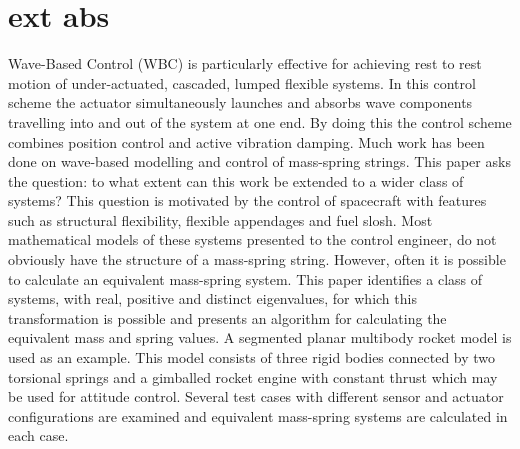 \documentclass{mbd_fullpaper}
\begin{document}
\section{ext abs}

Wave-Based Control (WBC) is particularly effective for achieving rest to rest motion of under-actuated, cascaded, lumped flexible systems.
In this control scheme the actuator simultaneously launches and absorbs wave components travelling into and out of the system at one end.
By doing this the control scheme combines position control and active vibration damping.
Much work has been done on wave-based modelling and control of mass-spring strings.
This paper asks the question: to what extent can this work be extended to a wider class of systems?
This question is motivated by the control of spacecraft with features such as structural flexibility, flexible appendages and fuel slosh.
Most mathematical models of these systems presented to the control engineer, do not obviously have the structure of a mass-spring string.
However, often it is possible to calculate an equivalent mass-spring system.
This paper identifies a class of systems, with real, positive and distinct eigenvalues, for which this transformation is possible and presents an algorithm for calculating the equivalent mass and spring values.
A segmented planar multibody rocket model is used as an example.
This model consists of three rigid bodies connected by two torsional springs and a gimballed rocket engine with constant thrust which may be used for attitude control.
Several test cases with different sensor and actuator configurations are examined and equivalent mass-spring systems are calculated in each case.




\end{document}
